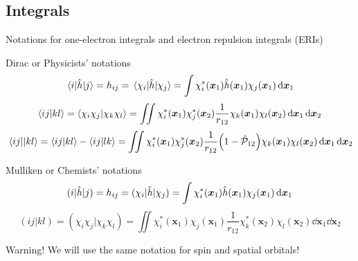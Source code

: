\documentclass[aspectratio=169,9pt]{beamer}
\newcommand{\bx}{\boldsymbol{x}}
\newcommand{\hh}{\Hat{h}}
\newcommand{\chP}{\Hat{\mathcal{P}}}
\newcommand{\rbraket}[2]{( #1 | #2 )}
\newcommand{\rmel}[3]{( #1 | #2 | #3 )}
\begin{document}
\subsection{Integrals}
\begin{frame}{Notations for one-electron integrals and electron repulsion integrals (ERIs)}
	\begin{block}{Dirac or Physicists' notations}
		\begin{equation*}
			\mel{i}{\hh}{j} = h_{ij} = \mel{\chi_i}{\hh}{\chi_j} = \int \chi_i^*(\bx_1) \hh(\bx_1) \chi_j(\bx_1) \dd{\bx_1} 
		\end{equation*}
		\begin{equation*}
			\braket{ij}{kl} 
			= \braket{\chi_i \chi_j}{\chi_k \chi_l}
			= \iint \chi_i^*(\bx_1) \chi_j^*(\bx_2) \frac{1}{r_{12}} \chi_k(\bx_1) \chi_l(\bx_2) \dd{\bx_1} \dd{\bx_2} 
		\end{equation*}
		\begin{equation*}
			\mel{ij}{}{kl} 
			= \braket{ij}{kl} - \braket{ij}{lk} 
			= \iint \chi_i^*(\bx_1) \chi_j^*(\bx_2) \frac{1}{r_{12}} \qty(1 - \chP_{12}) \chi_k(\bx_1) \chi_l(\bx_2) \dd{\bx_1} \dd{\bx_2} 
		\end{equation*}
	\end{block}
	\begin{block}{Mulliken or Chemists' notations}
		\begin{equation*}
			\rmel{i}{\hh}{j} = h_{ij} = \rmel{\chi_i}{\hh}{\chi_j} = \int \chi_i^*(\bx_1) \hh(\bx_1) \chi_j(\bx_1) \dd{\bx_1} 
		\end{equation*}
		\begin{equation*}
			\rbraket{ij}{kl} 
			= \rbraket{\chi_i \chi_j}{\chi_k \chi_l}
			= \iint \chi_i^*(\bx_1) \chi_j(\bx_1) \frac{1}{r_{12}} \chi_k^*(\bx_2) \chi_l(\bx_2) \dd{\bx_1} \dd{\bx_2} 
		\end{equation*}
	\end{block}
	\vfill
	\center
	\alert{Warning!} We will use the same notation for spin and spatial orbitals!
\end{frame}
\end{document}

